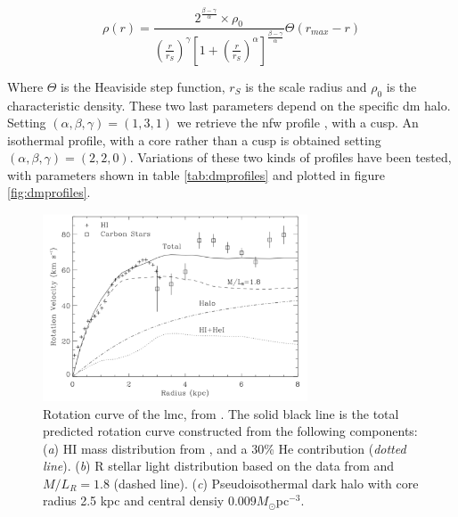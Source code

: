 \documentclass[main.tex]{subfiles}
\begin{document}
\begin{equation}
    \rho(r) = \frac{2^{\frac{\beta-\gamma}{\alpha}} \times \rho_{0}}{\left(\frac{r}{r_{S}}\right)^{\gamma}\left[ 1+\left(\frac{r}{r_{S}} \right)^{\alpha}\right]^{\frac{\beta-\gamma}{\alpha}}}\Theta(r_{max}-r)
\end{equation} \label{fig:gnfw}

Where $\Theta$ is the Heaviside step function, $r_{S}$ is the scale radius and $\rho_{0}$ is the characteristic density. These two last parameters depend on the specific \gls{dm} halo. Setting $(\alpha,\beta,\gamma) = (1,3,1)$ we retrieve the \gls{nfw} profile \cite{NFW}, with a cusp. An isothermal profile, with a core rather than a cusp is obtained setting $(\alpha,\beta,\gamma) = (2,2,0)$. Variations of these two kinds of profiles have been tested, with parameters shown in table \ref{tab:dmprofiles} and plotted in figure \ref{fig:dmprofiles}. 

\begin{figure}
  \centering
  \includegraphics[width=0.7\textwidth]{Pictures/rotationcurvelmc.pdf}
  \caption{\label{fig:rotcurve} Rotation curve of the \gls{lmc}, from \cite{LMCHI}. The solid black line is the total predicted rotation curve constructed from the following components: (\textit{a}) HI mass distribution from \cite{1992gasLMC}, and a 30\% He contribution (\textit{dotted line}). (\textit{b}) R stellar light distribution based on the data from \cite{1958starsinLMC} and $M/L_{R}=1.8$ (dashed line). (\textit{c}) Pseudoisothermal dark halo with core radius 2.5 kpc and central densiy $0.009 M_{\odot}$pc$^{-3}$.}
\end{figure}
\end{document}
